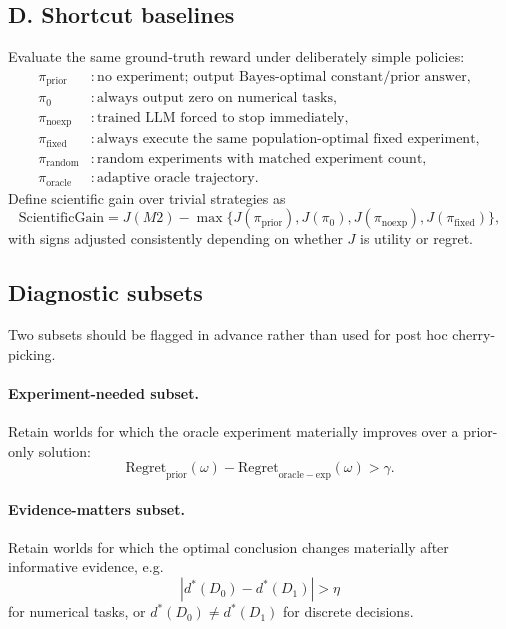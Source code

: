 \documentclass[11pt]{article}
\begin{document}
\subsection{D. Shortcut baselines}
Evaluate the same ground-truth reward under deliberately simple policies:
\begin{align*}
\pi_{\mathrm{prior}} &: \text{no experiment; output Bayes-optimal constant/prior answer},\\
\pi_{0} &: \text{always output zero on numerical tasks},\\
\pi_{\mathrm{noexp}} &: \text{trained LLM forced to stop immediately},\\
\pi_{\mathrm{fixed}} &: \text{always execute the same population-optimal fixed experiment},\\
\pi_{\mathrm{random}} &: \text{random experiments with matched experiment count},\\
\pi_{\mathrm{oracle}} &: \text{adaptive oracle trajectory}.
\end{align*}
Define scientific gain over trivial strategies as
\[
\mathrm{ScientificGain}
=J(M2)-\max\{J(\pi_{\mathrm{prior}}),J(\pi_0),J(\pi_{\mathrm{noexp}}),J(\pi_{\mathrm{fixed}})\},
\]
with signs adjusted consistently depending on whether $J$ is utility or regret.

\subsection{Diagnostic subsets}
Two subsets should be flagged in advance rather than used for post hoc cherry-picking.

\paragraph{Experiment-needed subset.}
Retain worlds for which the oracle experiment materially improves over a prior-only solution:
\[
\mathrm{Regret}_{\mathrm{prior}}(\omega)-
\mathrm{Regret}_{\mathrm{oracle-exp}}(\omega)>\gamma.
\]

\paragraph{Evidence-matters subset.}
Retain worlds for which the optimal conclusion changes materially after informative evidence, e.g.
\[
|d^*(D_0)-d^*(D_1)|>\eta
\]
for numerical tasks, or $d^*(D_0)\neq d^*(D_1)$ for discrete decisions.
\end{document}
